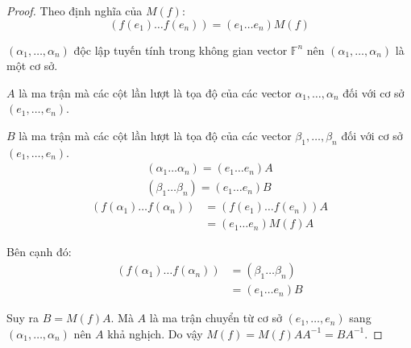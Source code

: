 \begin{proof}
    Theo định nghĩa của $M(f)$:
    \[
        (f(e_{1}) \ldots f(e_{n})) = (e_{1} \ldots e_{n})M(f)
    \]
    
    $(\alpha_{1}, \ldots, \alpha_{n})$ độc lập tuyến tính trong không gian vector $\mathbb{F}^{n}$ nên $(\alpha_{1}, \ldots, \alpha_{n})$ là một cơ sở.
    
    $A$ là ma trận mà các cột lần lượt là tọa độ của các vector $\alpha_{1}, \ldots, \alpha_{n}$ đối với cơ sở $(e_{1}, \ldots, e_{n})$.
    
    $B$ là ma trận mà các cột lần lượt là tọa độ của các vector $\beta_{1}, \ldots, \beta_{n}$ đối với cơ sở $(e_{1}, \ldots, e_{n})$.
    \[
        \begin{split}
            (\alpha_{1} \ldots \alpha_{n}) = (e_{1} \ldots e_{n})A \\
            (\beta_{1} \ldots \beta_{n}) = (e_{1} \ldots e_{n})B
        \end{split}
    \]
    \begin{align*}
        (f(\alpha_{1})\ldots f(\alpha_{n})) & = (f(e_{1})\ldots f(e_{n}))A \\
                                            & = (e_{1}\ldots e_{n})M(f)A
    \end{align*}
    
    Bên cạnh đó:
    \begin{align*}
        (f(\alpha_{1})\ldots f(\alpha_{n})) & = (\beta_{1} \ldots \beta_{n}) \\
                                            & = (e_{1} \ldots e_{n})B
    \end{align*}
    
    Suy ra $B = M(f)A$. Mà $A$ là ma trận chuyển từ cơ sở $(e_{1}, \ldots, e_{n})$ sang $(\alpha_{1}, \ldots, \alpha_{n})$ nên $A$ khả nghịch. Do vậy $M(f) = M(f)AA^{-1} = BA^{-1}$.
\end{proof}


